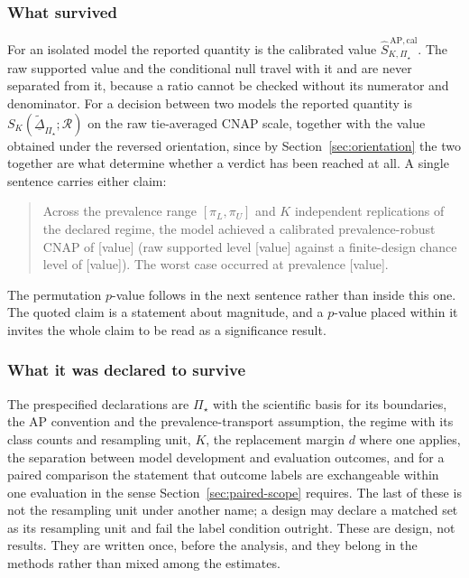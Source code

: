 \documentclass[11pt]{article}
\newcommand{\Regime}{\mathcal{R}}
\newcommand{\PSet}{\Pi_\star}
\newcommand{\SRobCalHat}{\widehat S_{K,\PSet}^{\,\mathrm{AP,cal}}}
\newcommand{\RobDta}{\underline{\widetilde{\Delta}}_{\PSet}}
\theoremstyle{remark}
\begin{document}
\subsubsection*{What survived}

For an isolated model the reported quantity is the calibrated value $\SRobCalHat$. The raw supported value and the conditional null travel with it and are never separated from it, because a ratio cannot be checked without its numerator and denominator. For a decision between two models the reported quantity is $S_K(\RobDta;\Regime)$ on the raw tie-averaged CNAP scale, together with the value obtained under the reversed orientation, since by Section~\ref{sec:orientation} the two together are what determine whether a verdict has been reached at all. A single sentence carries either claim:

\begin{quote}
Across the prevalence range $[\pi_L,\pi_U]$ and $K$ independent replications of the declared regime, the model achieved a calibrated prevalence-robust CNAP of [value] (raw supported level [value] against a finite-design chance level of [value]). The worst case occurred at prevalence [value].
\end{quote}

The permutation $p$-value follows in the next sentence rather than inside this one. The quoted claim is a statement about magnitude, and a $p$-value placed within it invites the whole claim to be read as a significance result.

\subsubsection*{What it was declared to survive}

The prespecified declarations are $\PSet$ with the scientific basis for its boundaries, the AP convention and the prevalence-transport assumption, the regime with its class counts and resampling unit, $K$, the replacement margin $d$ where one applies, the separation between model development and evaluation outcomes, and for a paired comparison the statement that outcome labels are exchangeable within one evaluation in the sense Section~\ref{sec:paired-scope} requires. The last of these is not the resampling unit under another name; a design may declare a matched set as its resampling unit and fail the label condition outright. These are design, not results. They are written once, before the analysis, and they belong in the methods rather than mixed among the estimates.
\end{document}

